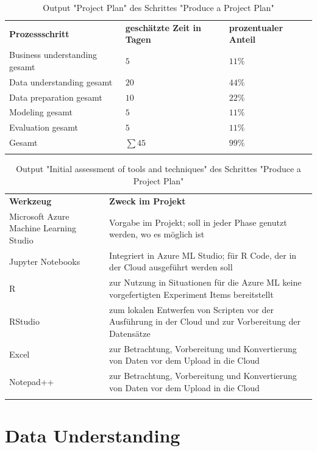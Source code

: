 \begin{centering} \footnotesize \begin{longtable}[!h]{|p{6cm}|p{4cm}|p{}|}
\hline
\textbf{Prozessschritt} & \textbf{geschätzte Zeit in Tagen} & \textbf{prozentualer Anteil} \\
\hhline{===}
Business understanding gesamt & $ 5$ &  $11 \%$ \\ \hline
Data understanding gesamt & $ 20$ &  $44 \%$ \\ \hline
Data preparation gesamt & $ 10$ &  $22 \%$ \\ \hline
Modeling gesamt & $ 5$ &  $11 \%$ \\ \hline
Evaluation gesamt & $ 5$ &  $11 \%$ \\ \hline
Gesamt & $\sum 45$ & $ 99 \%$ \\ \hline
\caption{Output "Project Plan" des Schrittes "Produce a Project Plan"}
\label{tab:projectPlan}
\end{longtable} \end{centering}
\begin{centering} \footnotesize \begin{longtable}[!h]{|p{4cm}|p{11cm}|}
\hline
\textbf{Werkzeug} & \textbf{Zweck im Projekt}\\ 
\hhline{==}
Microsoft Azure Machine Learning Studio & Vorgabe im Projekt; soll in jeder Phase genutzt werden, wo es möglich ist \\ \hline
Jupyter Notebooks & Integriert in Azure ML Studio; für R Code, der in der Cloud ausgeführt werden soll \\ \hline
R & zur Nutzung in Situationen für die Azure ML keine vorgefertigten Experiment Items bereitstellt \\ \hline
RStudio & zum lokalen Entwerfen von Scripten vor der Ausführung in der Cloud und zur Vorbereitung der Datensätze \\ \hline
Excel & zur Betrachtung, Vorbereitung und Konvertierung von Daten vor dem Upload in die Cloud \\ \hline
Notepad++ & zur Betrachtung, Vorbereitung und Konvertierung von Daten vor dem Upload in die Cloud \\ \hline
\caption{Output "Initial assessment of tools and techniques" des Schrittes "Produce a Project Plan"}
\end{longtable} \end{centering}

\section{Data Understanding}\label{sec:p2}
